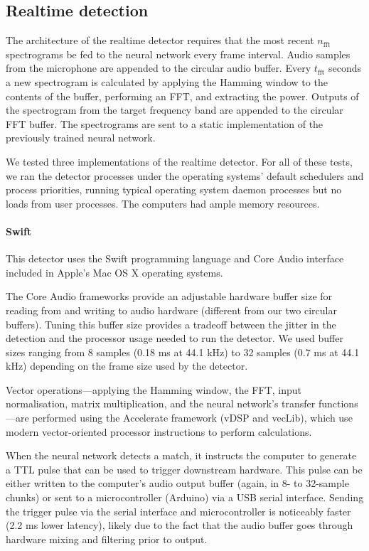 \documentclass[10pt,letterpaper]{article}
\renewcommand{\subsubsection}[1]{\paragraph{#1}}
\begin{document}
\subsection{Realtime detection}

The architecture of the realtime detector requires that the most
recent $n_\textrm{fft}$ spectrograms be fed to the neural network
every frame interval.  Audio samples from the microphone are appended
to the circular audio buffer.  Every $t_\textrm{fft}$ seconds a new
spectrogram is calculated by applying the Hamming window to the
contents of the buffer, performing an FFT, and extracting the
power. Outputs of the spectrogram from the target frequency band are
appended to the circular FFT buffer.  The spectrograms are sent to a
static implementation of the previously trained neural network.

We tested three implementations of the realtime detector.  For all of
these tests, we ran the detector processes under the operating
systems' default schedulers and process priorities, running typical
operating system daemon processes but no loads from user processes.
The computers had ample memory resources.

\subsubsection{Swift}

This detector uses the Swift programming language and Core Audio
interface included in Apple's Mac OS X operating systems.

The Core Audio frameworks provide an adjustable hardware buffer size
for reading from and writing to audio hardware (different from our two
circular buffers). Tuning this buffer size provides a tradeoff between
the jitter in the detection and the processor usage needed to run the
detector. We used buffer sizes ranging from 8 samples (0.18 ms at 44.1
kHz) to 32 samples (0.7 ms at 44.1 kHz) depending on the frame size 
used by the detector.

Vector operations---applying the Hamming window, the FFT, input
normalisation, matrix multiplication, and the neural network's
transfer functions---are performed using the Accelerate framework
(vDSP and vecLib), which use modern vector-oriented processor
instructions to perform calculations.

When the neural network detects a match, it instructs the computer to
generate a TTL pulse that can be used to trigger downstream hardware.
This pulse can be either written to the computer's audio output buffer
(again, in 8- to 32-sample chunks) or sent to a microcontroller
(Arduino) via a USB serial interface. Sending the trigger pulse via
the serial interface and microcontroller is noticeably faster (2.2 ms
lower latency), likely due to the fact that the audio buffer goes
through hardware mixing and filtering prior to output.
\end{document}
